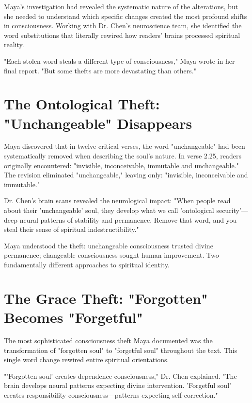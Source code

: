 \documentclass[11pt,twoside]{book}
\begin{document}
\vspace{0.3cm}

\normalfont\justifying
Maya's investigation had revealed the systematic nature of the alterations, but she needed to understand which specific changes created the most profound shifts in consciousness. Working with Dr. Chen's neuroscience team, she identified the word substitutions that literally rewired how readers' brains processed spiritual reality.

"Each stolen word steals a different type of consciousness," Maya wrote in her final report. "But some thefts are more devastating than others."
\section*{The Ontological Theft: "Unchangeable" Disappears}
\label{sec:org6b1da92}

Maya discovered that in twelve critical verses, the word "unchangeable" had been systematically removed when describing the soul's nature. In verse 2.25, readers originally encountered: "invisible, inconceivable, immutable and unchangeable." The revision eliminated "unchangeable," leaving only: "invisible, inconceivable and immutable."

Dr. Chen's brain scans revealed the neurological impact: "When people read about their 'unchangeable' soul, they develop what we call 'ontological security'—deep neural patterns of stability and permanence. Remove that word, and you steal their sense of spiritual indestructibility."

Maya understood the theft: unchangeable consciousness trusted divine permanence; changeable consciousness sought human improvement. Two fundamentally different approaches to spiritual identity.
\section*{The Grace Theft: "Forgotten" Becomes "Forgetful"}
\label{sec:orgf556da3}

The most sophisticated consciousness theft Maya documented was the transformation of "forgotten soul" to "forgetful soul" throughout the text. This single word change rewired entire spiritual orientations.

"'Forgotten soul' creates dependence consciousness," Dr. Chen explained. "The brain develops neural patterns expecting divine intervention. 'Forgetful soul' creates responsibility consciousness—patterns expecting self-correction."
\end{document}

